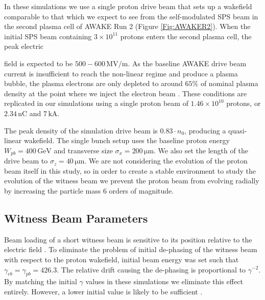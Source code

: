 \documentclass[aps,prstab,reprint,amsmath,amssymb,groupedaddress]{revtex4-1}
\newcommand{\unit}[1]{\,\mathrm{#1}}
\newcommand{\funit}[2]{\,\mathrm{#1}/\mathrm{#2}}
\newcommand{\nexp}[1]{\times 10^{#1}}
\begin{document}
In these simulations we use a single proton drive beam that sets up a wakefield comparable to that which we expect to
see from the self-modulated SPS beam in the second plasma cell of AWAKE Run 2 (Figure \ref{Fig:AWAKER2}). When the
initial SPS beam containing $3\nexp{11}$ protons \cite{gschwendtner:2016} enters the second plasma cell, the peak
electric

field is expected to be $500-600\funit{MV}{m}$. As the baseline AWAKE drive beam current is insufficient to
reach the non-linear regime and produce a plasma bubble, the plasma electrons are only depleted to around $65\%$ of
nominal plasma density at the point where we inject the electron beam \cite{awake_collaboration:2016}. These conditions
are replicated in our simulations using a single proton beam of $1.46\nexp{10}$ protons, or $2.34\unit{nC}$ and
$7\unit{kA}$.

The peak density of the simulation drive beam is $0.83\cdot n_{0}$, producing a quasi-linear wakefield. The single bunch
setup uses the baseline proton energy $W_{pb} = 400\unit{GeV}$ and transverse size $\sigma_{x} = 200\unit{\mu m}$. We
also set the length of the drive beam to $\sigma_{z} = 40\unit{\mu m}$. We are not considering the evolution of the
proton beam itself in this study, so in order to create a stable environment to study the evolution of the witness beam
we prevent the proton beam from evolving radially by increasing the particle mass 6 orders of magnitude.

\subsection{Witness Beam Parameters}\label{S:M:Setup}

Beam loading of a short witness beam is sensitive to its position relative to the electric field \cite{tzoufras:2009}.
To eliminate the problem of initial de-phasing of the witness beam with respect to the proton wakefield, initial beam
energy was set such that $\gamma_{eb} = \gamma_{pb} = 426.3$. The relative drift causing the de-phasing is proportional
to $\gamma^{-2}$. By matching the initial $\gamma$ values in these simulations we eliminate this effect entirely.
However, a lower initial value is likely to be sufficient \cite{berglyd_olsen:2015}.
\end{document}
